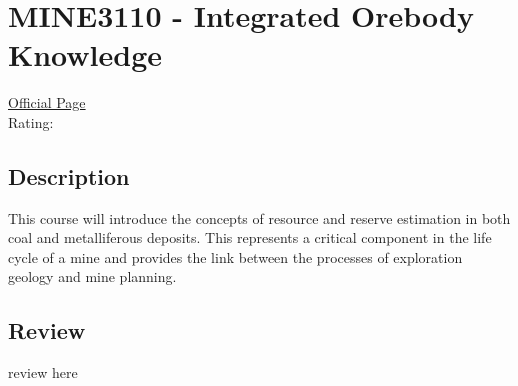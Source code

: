 \hypertarget{MINE3110}{\section{MINE3110 - Integrated Orebody Knowledge}}

\large
\textcolor{turbo_purple}{\href{https://my.uq.edu.au/programs-courses/course.html?course_code=MINE3110}{Official Page}} \\
Rating: \cstar\cstar\cstar\cstar\ostar

\normalsize
\subsection*{Description}
This course will introduce the concepts of resource and reserve estimation in both coal and metalliferous deposits.
This represents a critical component in the life cycle of a mine and provides the link between the processes of exploration geology and mine planning.

\subsection*{Review}
review here
